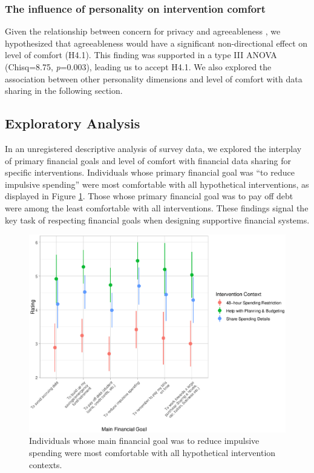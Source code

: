 \documentclass[10pt]{article}
\begin{document}
\subsubsection{The influence of personality on intervention comfort}

Given the relationship between concern for privacy and agreeableness \cite{najafianfactors2021, junglaspersonality2008}, we hypothesized that agreeableness would have a significant non-directional effect on level of comfort (H4.1). This finding was supported in a type III ANOVA (Chisq=8.75, \emph{p}=0.003), leading us to accept H4.1. We also explored the association between other personality dimensions and level of comfort with data sharing in the following section.

\subsection{Exploratory Analysis}\label{exploratory-analysis}

In an unregistered descriptive analysis of survey data, we explored the interplay of primary financial goals and level of comfort with financial data sharing for specific interventions. Individuals whose primary financial goal was ``to reduce impulsive spending'' were most comfortable with all hypothetical interventions, as displayed in Figure \ref{fig:expl_main_financialgoal_context}. Those whose primary financial goal was to pay off debt were among the least comfortable with all interventions. These findings signal the key task of respecting financial goals when designing supportive financial systems.

\begin{figure}[!ht]
  \centering
  \includegraphics[scale=0.6]{figures/expl_main_financialgoal_context.eps}
  \caption{Individuals whose main financial goal was to reduce impulsive spending were most comfortable with all hypothetical intervention contexts.}
  \label{fig:expl_main_financialgoal_context}
\end{figure}
\end{document}
